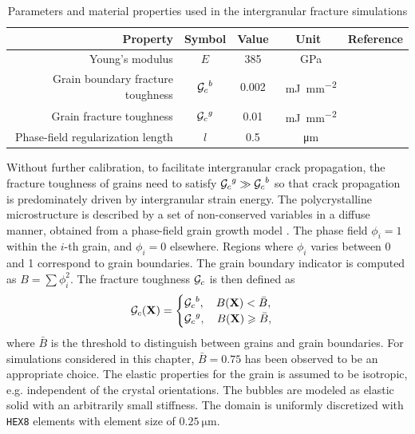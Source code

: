 \begin{table}[!htb]
  \centering
  \caption{Parameters and material properties used in the intergranular fracture simulations}
  \label{table: brittle material properties}
  \begin{tabular}{ r c c c c }
    \toprule
    \textbf{Property}                 & \textbf{Symbol} & \textbf{Value} & \textbf{Unit}                              & \textbf{Reference} \\
    \midrule
    Young's modulus                   & $E$             & 385            & \SI{}{\giga\pascal}                        & \cite{govers_2007} \\
    Grain boundary fracture toughness & ${\mathcal{G}_c}^b$         & 0.002          & \SI{}{\milli\joule\per\square\milli\meter} & \cite{pritam_2016} \\
    Grain fracture toughness          & ${\mathcal{G}_c}^g$         & 0.01           & \SI{}{\milli\joule\per\square\milli\meter} &                    \\
    Phase-field regularization length & $l$             & 0.5            & \SI{}{\micro\meter}                        &                    \\
    \bottomrule
  \end{tabular}
\end{table}

Without further calibration, to facilitate intergranular crack propagation, the fracture toughness of grains need to satisfy ${\mathcal{G}_c}^g \gg {\mathcal{G}_c}^b$
so that crack propagation is predominately driven by intergranular strain energy. The polycrystalline microstructure is described by a set of non-conserved variables in a diffuse manner, obtained from a phase-field grain growth model \cite{Moelans2008}. The phase field $\phi_i = 1$ within the $i$-th grain, and $\phi_i = 0$ elsewhere. Regions where $\phi_i$ varies between 0 and 1 correspond to grain boundaries. The grain boundary indicator is computed as $B = \sum\phi_i^2$. The fracture toughness ${\mathcal{G}_c}$ is then defined as
\begin{align}
  {\mathcal{G}_c}(\textbf{X}) =
  \begin{cases}
    {\mathcal{G}_c}^b, \quad B(\textbf{X}) < \bar{B}, \\
    {\mathcal{G}_c}^g, \quad B(\textbf{X}) \geqslant \bar{B},
  \end{cases}
\end{align}
where $\bar{B}$ is the threshold to distinguish between grains and grain boundaries. For simulations considered in this chapter, $\bar{B} = 0.75$ has been observed to be an appropriate choice. The elastic properties for the grain is assumed to be isotropic, e.g. independent of the crystal orientations. The bubbles are modeled as elastic solid with an arbitrarily small stiffness. The domain is uniformly discretized with \texttt{HEX8} elements with element size of $\SI{0.25}{\micro\meter}$.

